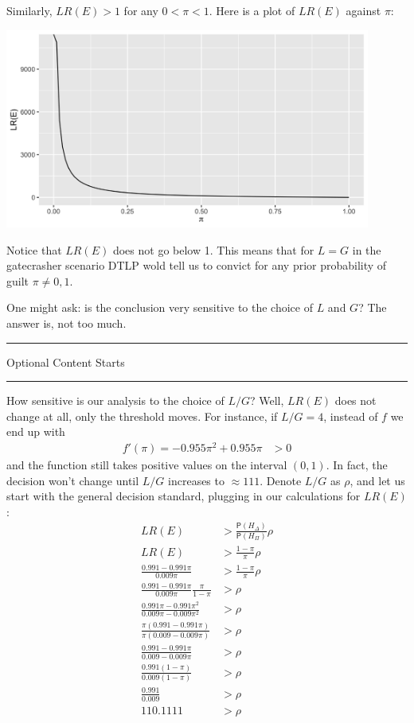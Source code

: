 \documentclass[10pt,dvipsnames,enabledeprecatedfontcommands]{scrartcl}
\newcommand{\pr}[1]{\mathsf{P}(#1)}
\newcommand{\intermezzoa}{
	\begin{minipage}[c]{13cm}
	\begin{center}\rule{10cm}{0.4pt}



	\tiny{\sc Optional Content Starts}
	
	\vspace{-1mm}
	
	\rule{10cm}{0.4pt}\end{center}
	\end{minipage}\nopagebreak 
	}
\begin{document}
Similarly, \(LR(E)>1\) for any \(0< \pi <1\). Here is a plot of
\(LR(E)\) against \(\pi\):

\includegraphics[width=12cm]{lre-gate.png}

\noindent Notice that \(LR(E)\) does not go below 1. This means that for
\(L=G\) in the gatecrasher scenario DTLP wold tell us to convict for any
prior probability of guilt \(\pi\neq 0,1\).

One might ask: is the conclusion very sensitive to the choice of \(L\)
and \(G\)? The answer is, not too much.

\intermezzoa

How sensitive is our analysis to the choice of \(L/G\)? Well, \(LR(E)\)
does not change at all, only the threshold moves. For instance, if
\(L/G=4\), instead of \(f\) we end up with \begin{align*}
 f'(\pi) = - 0.955 \pi^2 + 0.955\pi &>0 
 \end{align*} and the function still takes positive values on the
interval \((0,1)\). In fact, the decision won't change until \(L/G\)
increases to \(\approx 111\). Denote \(L/G\) as \(\rho\), and let us
start with the general decision standard, plugging in our calculations
for \(LR(E)\): \begin{align*}
LR(E) &> \frac{\pr{H_\Delta}}{\pr{H_\Pi}} \rho\\
LR(E) &> \frac{1-\pi}{\pi} \rho \\
\frac{0.991-0.991\pi}{0.009\pi} &> \frac{1-\pi}{\pi} \rho\\
\frac{0.991-0.991\pi}{0.009\pi}\frac{\pi}{1-\pi} &>  \rho\\
\frac{0.991\pi-0.991\pi^2}{0.009\pi-0.009\pi^2} &>  \rho\\
\frac{\pi(0.991-0.991\pi)}{\pi(0.009-0.009\pi)} &>  \rho\\
\frac{0.991-0.991\pi}{0.009-0.009\pi} &>  \rho\\
\frac{0.991(1-\pi)}{0.009(1-\pi)} &>  \rho\\
\frac{0.991}{0.009} &>  \rho\\
110.1111 &>  \rho\\
\end{align*}
\end{document}

